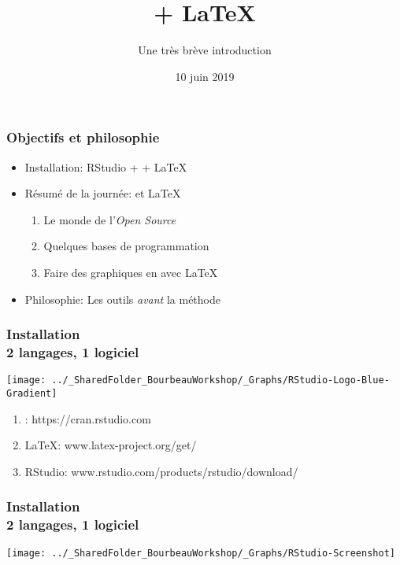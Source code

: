 \documentclass{beamer}
\title{\R + \LaTeX}
\subtitle{Une très brève introduction}
\date{10 juin 2019}
\begin{document}

	\frame{\titlepage}



    \begin{frame}
        \frametitle{Objectifs et philosophie}
        \begin{itemize}
            \item<2-> Installation:  RStudio + \R + \LaTeX
            \item<3-> Résumé de la journée: \R et \LaTeX
                      \begin{enumerate}
                        \item Le monde de l'\emph{Open Source}
                        \item Quelques bases de programmation \R
                        \item Faire des graphiques en \R avec \LaTeX
                      \end{enumerate}
            \item<4-> Philosophie: Les outils \emph{avant} la méthode
        \end{itemize}
    \end{frame}

   \begin{frame}
            \frametitle{Installation \\ \vspace{0.2cm} 2 langages, 1 logiciel}
            \vspace{0.5cm}
            \begin{center}
              \texttt{[image: ../\_SharedFolder\_BourbeauWorkshop/\_Graphs/RStudio-Logo-Blue-Gradient]}
            \end{center} 
            \begin{enumerate}
                \item<2-> \R: https://cran.rstudio.com
                \item<3-> \LaTeX: www.latex-project.org/get/
                \item<4-> RStudio: www.rstudio.com/products/rstudio/download/
            \end{enumerate}
    \end{frame}
    
    \begin{frame}
            \frametitle{Installation \\ \vspace{0.2cm} 2 langages, 1 logiciel}
            \vspace{2.3cm}
            \begin{center}
              \texttt{[image: ../\_SharedFolder\_BourbeauWorkshop/\_Graphs/RStudio-Screenshot]}
            \end{center} 
    \end{frame}
\end{document}
